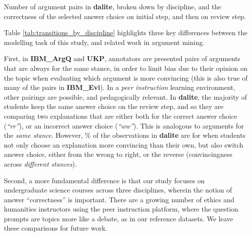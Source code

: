 \documentclass[runningheads]{llncs}
\begin{document}
\begin{table}
	\caption{Number of argument pairs in \textbf{dalite}, broken down by 
	discipline, and the 
	correctness of the selected answer choice on initial step, and then on 
	review step.}
	
	\centerline{}
	
	\label{tab:transitions_by_discipline}
\end{table}

Table \ref{tab:transitions_by_discipline} highlights three key differences 
between the modelling task of this study, and related work in argument mining. 

First, in \textbf{IBM\_ArgQ} and \textbf{UKP}, annotators are presented pairs 
of arguments that are always for the same stance, in order to limit bias due to 
their opinion on the topic when evaluating which argument is more convincing 
(this is also true of many of the pairs in \textbf{IBM\_Evi}).
In a \textit{peer instruction} learning environment, other pairings are 
possible, and pedagogically relevant. 
In \textbf{dalite}, the majority of students keep the same answer choice 
on the review step, and so they are comparing two explanations that 
are either both for the correct answer choice (\textit{``rr''}), or an 
incorrect answer choice (\textit{``ww''}).
This is analogous to arguments for the \textit{same stance}. 
However, \% of the 
observations in \textbf{dalite} are for when students not only choose an 
explanation more convincing than their own, but also switch answer choice, 
either from the wrong to right, or the reverse (convincingness across 
\textit{different stances}).
 
Second, a more fundamental difference is that our study focuses on 
undergraduate science courses across three disciplines, wherein the notion of 
answer ``correctness'' is important.
There are a growing number of ethics and humanities instructors using the peer 
instruction platform, where the question prompts are topics more like a debate, 
as in our reference datasets. 
We leave these comparisons for future work.
\end{document}
